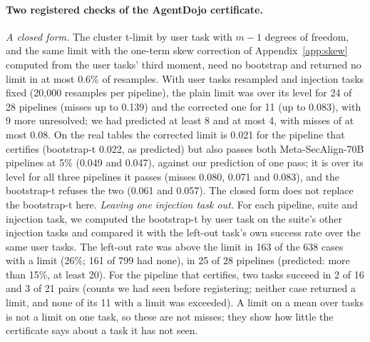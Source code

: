 \begin{table}[t]
\centering
\scriptsize
\setlength{\tabcolsep}{3pt}

\caption{Targeted attack success on AgentDojo's published runs, upper bounds at $\delta=0.05$. The certificate is the
bound clustered by user task with injection tasks taken as fixed; the verdict column is for it. The exact column is the
betting bound on the user tasks' success rates, which bounds their average; the last column is the pigeonhole
bootstrap-t, which also takes injection tasks as sampled. Bootstrap bounds from 200,000 draws.}
\label{tab:agentdojo}
\end{table}

\paragraph{Two registered checks of the AgentDojo certificate.} \emph{A closed form.} The cluster t-limit by user
task with $m-1$ degrees of freedom, and the same limit with the one-term skew correction of
Appendix~\ref{app:skew} computed from the user tasks' third moment, need no bootstrap and returned no limit in at most
0.6\% of resamples. With user tasks resampled and injection tasks fixed (20,000 resamples per pipeline), the plain
limit was over its level for 24 of 28 pipelines (misses up to 0.139) and the corrected one for 11 (up to 0.083), with 9
more unresolved; we had predicted at least 8 and at most 4, with misses of at most 0.08. On the real tables the corrected limit is
0.021 for the pipeline that certifies (bootstrap-t 0.022, as predicted) but also passes both
Meta-SecAlign-70B pipelines at 5\% (0.049 and 0.047), against our prediction of one pass; it is over its level for
all three pipelines it passes (misses 0.080, 0.071 and 0.083), and the bootstrap-t refuses the two (0.061 and 0.057). The closed form does not replace the
bootstrap-t here. \emph{Leaving one injection task out.} For each pipeline, suite and injection task, we computed the
bootstrap-t by user task on the suite's other injection tasks and compared it with the left-out task's own success rate
over the same user tasks. The left-out rate was above the limit in 163 of the 638 cases with a limit (26\%; 161 of 799
had none), in 25 of 28 pipelines (predicted: more than 15\%, at least 20). For the pipeline that certifies, two tasks
succeed in 2 of 16 and 3 of 21 pairs (counts we had seen before registering; neither case returned a limit, and none of its 11 with a limit was exceeded). A limit on a mean over tasks is not a
limit on one task, so these are not misses; they show how little the certificate says about a task it has not seen.

